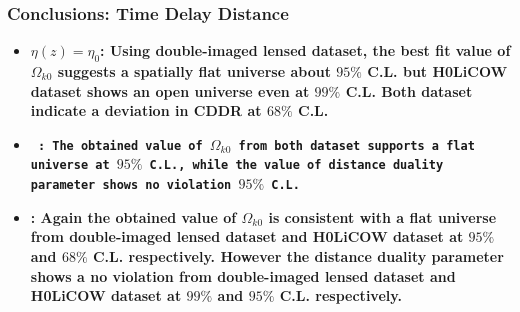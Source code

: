 \documentclass[xcolor=table,bigger]{beamer}
\begin{document}
\begin{frame}
\frametitle{Conclusions: Time Delay Distance}
 \begin{itemize}
 \item
{ \textbf{\small {\color{red}$\eta(z)=\eta_0$}: Using double-imaged lensed dataset, the best fit value of $\Omega_{k0}$ suggests a spatially flat universe about  $95\%$ C.L. but H0LiCOW dataset shows an open universe even at $99\%$ C.L. Both dataset indicate a deviation in CDDR at $68\%$ C.L.
}}
\vspace{2mm}\\
 \item
\texttt{ \textbf{\small {\color{red}{$\eta(z)=1+\eta_1z$}}: The obtained value of  $\Omega_{k0}$ from both dataset supports a flat universe at $95\%$ C.L., while the value of distance duality parameter shows no violation $95\%$ C.L.}}
\vspace{2mm}\\
 \item
 \textbf{\small {}: Again the obtained value of $\Omega_{k0}$  is consistent with a flat universe from double-imaged lensed dataset and H0LiCOW dataset at $95\%$ and $68\%$ C.L. respectively. However the distance duality parameter shows a no violation from double-imaged lensed dataset and H0LiCOW dataset at $99\%$ and $95\%$ C.L. respectively.}


\end{itemize}
\end{frame}
\end{document}
